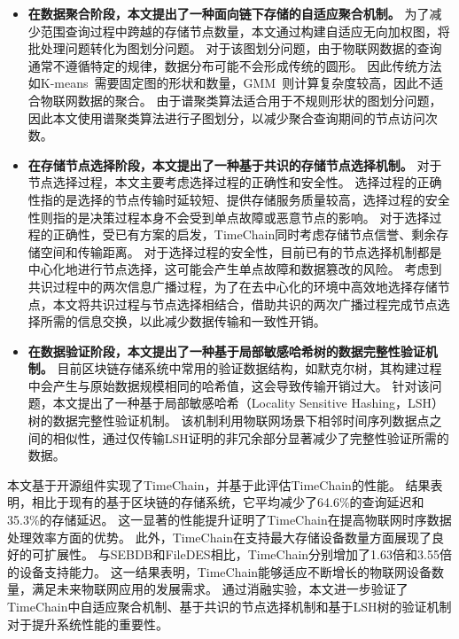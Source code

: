 \begin{itemize}
    \item \textbf{在数据聚合阶段，本文提出了一种面向链下存储的自适应聚合机制。}
    为了减少范围查询过程中跨越的存储节点数量，本文通过构建自适应无向加权图，将批处理问题转化为图划分问题。
    对于该图划分问题，由于物联网数据的查询通常不遵循特定的规律，数据分布可能不会形成传统的圆形。
    因此传统方法如K-means~\cite{kanungo2002efficient}需要固定图的形状和数量，GMM~\cite{he2010laplacian}则计算复杂度较高，因此不适合物联网数据的聚合。
    由于谱聚类算法适合用于不规则形状的图划分问题，因此本文使用谱聚类算法进行子图划分，以减少聚合查询期间的节点访问次数。

    \item \textbf{在存储节点选择阶段，本文提出了一种基于共识的存储节点选择机制。}
    对于节点选择过程，本文主要考虑选择过程的正确性和安全性。
    选择过程的正确性指的是选择的节点传输时延较短、提供存储服务质量较高，选择过程的安全性则指的是决策过程本身不会受到单点故障或恶意节点的影响。
    对于选择过程的正确性，受已有方案的启发，TimeChain同时考虑存储节点信誉、剩余存储空间和传输距离。
    对于选择过程的安全性，目前已有的节点选择机制都是中心化地进行节点选择，这可能会产生单点故障和数据篡改的风险。
    考虑到共识过程中的两次信息广播过程，为了在去中心化的环境中高效地选择存储节点，本文将共识过程与节点选择相结合，借助共识的两次广播过程完成节点选择所需的信息交换，以此减少数据传输和一致性开销。

    \item \textbf{在数据验证阶段，本文提出了一种基于局部敏感哈希树的数据完整性验证机制。}
    目前区块链存储系统中常用的验证数据结构，如默克尔树，其构建过程中会产生与原始数据规模相同的哈希值，这会导致传输开销过大。
    针对该问题，本文提出了一种基于局部敏感哈希（Locality Sensitive Hashing，LSH）树的数据完整性验证机制。
    该机制利用物联网场景下相邻时间序列数据点之间的相似性，通过仅传输LSH证明的非冗余部分显著减少了完整性验证所需的数据。
\end{itemize}

本文基于开源组件实现了TimeChain，并基于此评估TimeChain的性能。
结果表明，相比于现有的基于区块链的存储系统，它平均减少了64.6\%的查询延迟和35.3\%的存储延迟。
这一显著的性能提升证明了TimeChain在提高物联网时序数据处理效率方面的优势。
此外，TimeChain在支持最大存储设备数量方面展现了良好的可扩展性。
与SEBDB和FileDES相比，TimeChain分别增加了1.63倍和3.55倍的设备支持能力。
这一结果表明，TimeChain能够适应不断增长的物联网设备数量，满足未来物联网应用的发展需求。
通过消融实验，本文进一步验证了TimeChain中自适应聚合机制、基于共识的节点选择机制和基于LSH树的验证机制对于提升系统性能的重要性。

